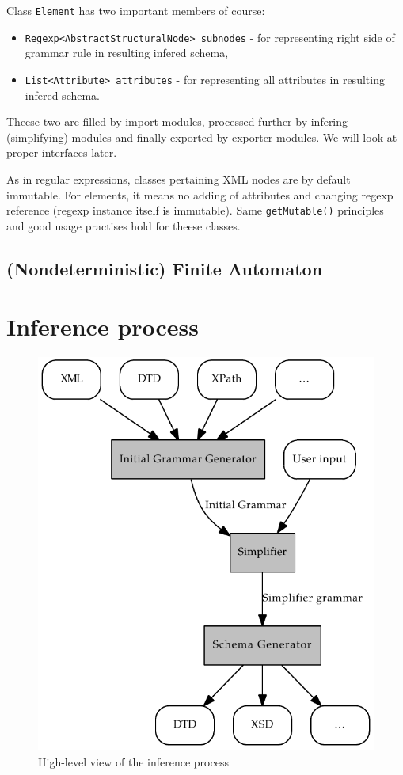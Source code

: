 \documentclass[a4paper,10pt,oneside]{article}
\newcommand{\myscale}{0.74}
\newcommand{\code}[1]{\texttt{#1}}
\begin{document}
Class \code{Element} has two important members of course:
\begin{itemize}
	\item \code{Regexp<AbstractStructuralNode> subnodes} - for representing right side of grammar rule in resulting infered schema,
	\item \code{List<Attribute> attributes} - for representing all attributes in resulting infered schema.
\end{itemize}
Theese two are filled by import modules, processed further by infering (simplifying) modules and finally exported by exporter modules. We will look at proper interfaces later.

As in regular expressions, classes pertaining XML nodes are by default immutable.
For elements, it means no adding of attributes and changing regexp reference (regexp instance itself is immutable).
Same \code{getMutable()} principles and good usage practises hold for theese classes.

\subsection{(Nondeterministic) Finite Automaton}


\section{Inference process}
\begin{figure}
	\caption{High-level view of the inference process} \label{inference_process}
	\centering\includegraphics[scale=\myscale]{inference_process}
\end{figure}
\end{document}
